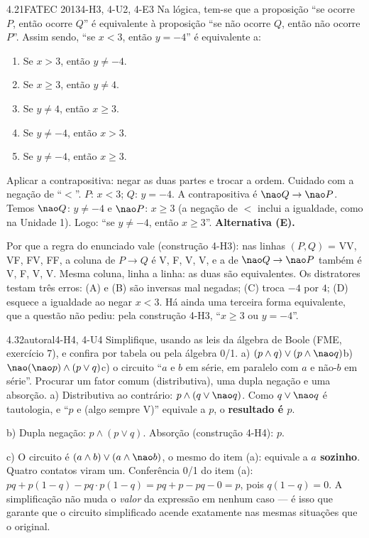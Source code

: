 \begin{exemplo}{4.2}{1}{FATEC 2013}{4-H3, 4-U2, 4-E3}\label{ex:4.2}
Na lógica, tem-se que a proposição \enquote{se ocorre $P$, então ocorre $Q$} é equivalente à proposição \enquote{se não ocorre $Q$, então não ocorre $P$}. Assim sendo, \enquote{se $x<3$, então $y=-4$} é equivalente a:
\begin{enumerate}[label=(\Alph*)]
  \item Se $x>3$, então $y\neq-4$.
  \item Se $x\ge3$, então $y\neq4$.
  \item Se $y\neq4$, então $x\ge3$.
  \item Se $y\neq-4$, então $x>3$.
  \item Se $y\neq-4$, então $x\ge3$.
\end{enumerate}
\plano Aplicar a contrapositiva: negar as duas partes e trocar a ordem. Cuidado com a negação de \enquote{$<$}.
\resolucao
$P$: $x<3$; $Q$: $y=-4$. A contrapositiva é ${\nao}Q\rightarrow{\nao}P$. Temos ${\nao}Q$: $y\neq-4$ e ${\nao}P$: $x\ge3$ (a negação de $<$ inclui a igualdade, como na Unidade 1). Logo: \enquote{se $y\neq-4$, então $x\ge3$}. \textbf{Alternativa (E).}
\par Por que a regra do enunciado vale (construção 4-H3): nas linhas $(P,Q)$ = VV, VF, FV, FF, a coluna de $P\rightarrow Q$ é V, F, V, V, e a de ${\nao}Q\rightarrow{\nao}P$ também é V, F, V, V. Mesma coluna, linha a linha: as duas são equivalentes.
\comentario Os distratores testam três erros: (A) e (B) são inversas mal negadas; (C) troca $-4$ por $4$; (D) esquece a igualdade ao negar $x<3$. Há ainda uma terceira forma equivalente, que a questão não pediu: pela construção 4-H3, \enquote{$x\ge3$ ou $y=-4$}.
\end{exemplo}

\begin{exemplo}{4.3}{2}{autoral}{4-H4, 4-U4}\label{ex:4.3}
Simplifique, usando as leis da álgebra de Boole (FME, exercício 7), e confira por tabela ou pela álgebra 0/1.\quad
a) $(p\wedge q)\vee(p\wedge{\nao}q)$\quad b) ${\nao}({\nao}p)\wedge(p\vee q)$\quad c) o circuito \enquote{$a$ e $b$ em série, em paralelo com $a$ e não-$b$ em série}.
\plano Procurar um fator comum (distributiva), uma dupla negação e uma absorção.
\resolucao
a) Distributiva ao contrário: $p\wedge(q\vee{\nao}q)$. Como $q\vee{\nao}q$ é tautologia, e \enquote{$p$ e (algo sempre V)} equivale a $p$, o \textbf{resultado é $p$}.
\par b) Dupla negação: $p\wedge(p\vee q)$. Absorção (construção 4-H4): \textbf{$p$}.
\par c) O circuito é $(a\wedge b)\vee(a\wedge{\nao}b)$, o mesmo do item (a): equivale a \textbf{$a$ sozinho}. Quatro contatos viram um.
\comentario Conferência 0/1 do item (a): $pq+p(1-q)-pq\cdot p(1-q)=pq+p-pq-0=p$, pois $q(1-q)=0$. A simplificação não muda o \emph{valor} da expressão em nenhum caso — é isso que garante que o circuito simplificado acende exatamente nas mesmas situações que o original.
\end{exemplo}

